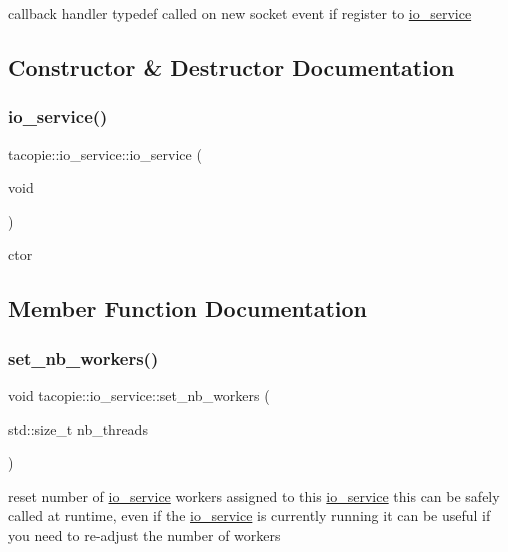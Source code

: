 callback handler typedef called on new socket event if register to \hyperlink{classtacopie_1_1io__service}{io\+\_\+service} 

\subsection{Constructor \& Destructor Documentation}
\mbox{\label{classtacopie_1_1io__service_a4cd4a873cb4457cdc28bd2d00665d15a}} 
\subsubsection{\texorpdfstring{io\+\_\+service()}{io\_service()}}
{\footnotesize\ttfamily tacopie\+::io\+\_\+service\+::io\+\_\+service (\begin{DoxyParamCaption}\item[{void}]{ }\end{DoxyParamCaption})}

ctor 

\subsection{Member Function Documentation}
\mbox{\label{classtacopie_1_1io__service_a7e2b0700c0a4591f86c344df8748b3a5}} 
\subsubsection{\texorpdfstring{set\+\_\+nb\+\_\+workers()}{set\_nb\_workers()}}
{\footnotesize\ttfamily void tacopie\+::io\+\_\+service\+::set\+\_\+nb\+\_\+workers (\begin{DoxyParamCaption}\item[{std\+::size\+\_\+t}]{nb\+\_\+threads }\end{DoxyParamCaption})}

reset number of \hyperlink{classtacopie_1_1io__service}{io\+\_\+service} workers assigned to this \hyperlink{classtacopie_1_1io__service}{io\+\_\+service} this can be safely called at runtime, even if the \hyperlink{classtacopie_1_1io__service}{io\+\_\+service} is currently running it can be useful if you need to re-\/adjust the number of workers


